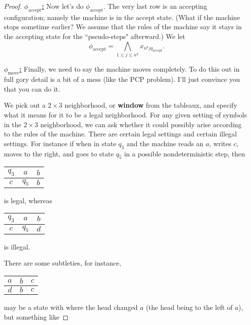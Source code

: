 \begin{proof}
\noindent
\ul{\textbf{$\phi_{\text{accept}}$:}} 
Now let's do $\phi_{\text{accept}}$. The very last row is an accepting configuration; namely the machine is in the accept state. (What if the machine stops sometime earlier? We assume that the rules of the machine say it stays in the accepting state for the ``pseudo-steps" afterward.) We let
\[
\phi_{\text{accept}} = \bigwedge_{1\le j\le n^k} x_{n^kjq_{\text{accept}}}.
\]

\noindent
\ul{\textbf{$\phi_{\text{move}}$:}} 
Finally, we need to say the machine moves completely. To do this out in full gory detail is a bit of a mess (like the PCP problem). I'll just convince you that you can do it.

We pick out a $2\times 3$ neighborhood, or \textbf{window} from the tableaux, and specify what it means for it to be a legal neighborhood.  For any given setting of symbols in the $2\times 3$ neighborhood, we can ask whether it could possibly arise according to the rules of the machine. There are certain legal settings and certain illegal settings. For instance if when in state $q_3$ and the machine reads an $a$, writes $c$, moves to the right, and goes to state $q_5$ in a possible nondeterministic step, then 

\begin{center}
\begin{tabular}{|c|c|c|}
\hline 
$q_{3}$ & $a$ & $b$\tabularnewline
\hline 
$c$ & $q_{5}$ & $b$\tabularnewline
\hline 
\end{tabular}
\end{center}
is legal,
whereas

\begin{center}
\begin{tabular}{|c|c|c|}
\hline 
$q_{3}$ & $a$ & $b$\tabularnewline
\hline 
$c$ & $q_{5}$ & $d$\tabularnewline
\hline 
\end{tabular}
\end{center}
is illegal.

There are some subtleties, for instance,

\begin{center}
\begin{tabular}{|c|c|c|}
\hline 
$a$ & $b$ & $c$\tabularnewline
\hline 
$d$ & $b$ & $c$\tabularnewline
\hline 
\end{tabular}
\end{center}
may be a state with where the head changed $a$ (the head being to the left of $a$), but something like 


\end{proof}
